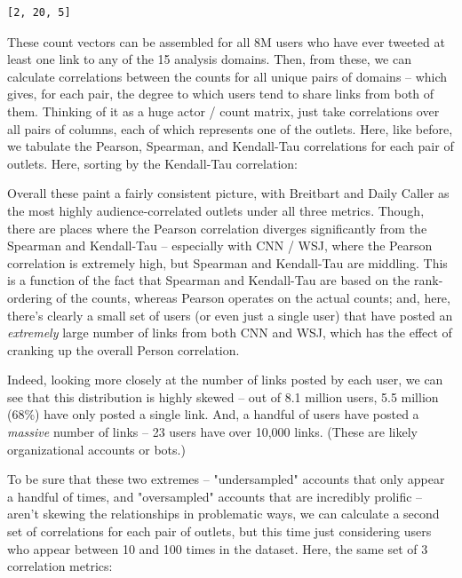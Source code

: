 \documentclass{scrartcl}
\begin{document}
\begin{lstlisting}
[2, 20, 5]
\end{lstlisting}

These count vectors can be assembled for all 8M users who have ever tweeted at least one link to any of the 15 analysis domains. Then, from these, we can calculate correlations between the counts for all unique pairs of domains -- which gives, for each pair, the degree to which users tend to share links from both of them. Thinking of it as a huge actor / count matrix, just take correlations over all pairs of columns, each of which represents one of the outlets. Here, like before, we tabulate the Pearson, Spearman, and Kendall-Tau correlations for each pair of outlets. Here, sorting by the Kendall-Tau correlation:


Overall these paint a fairly consistent picture, with Breitbart and Daily Caller as the most highly audience-correlated outlets under all three metrics. Though, there are places where the Pearson correlation diverges significantly from the Spearman and Kendall-Tau -- especially with CNN / WSJ, where the Pearson correlation is extremely high, but Spearman and Kendall-Tau are middling. This is a function of the fact that Spearman and Kendall-Tau are based on the rank-ordering of the counts, whereas Pearson operates on the actual counts; and, here, there's clearly a small set of users (or even just a single user) that have posted an \textit{extremely} large number of links from both CNN and WSJ, which has the effect of cranking up the overall Person correlation.

Indeed, looking more closely at the number of links posted by each user, we can see that this distribution is highly skewed -- out of 8.1 million users, 5.5 million (68\%) have only posted a single link. And, a handful of users have posted a \textit{massive} number of links -- 23 users have over 10,000 links. (These are likely organizational accounts or bots.)


To be sure that these two extremes -- "undersampled" accounts that only appear a handful of times, and "oversampled" accounts that are incredibly prolific -- aren't skewing the relationships in problematic ways, we can calculate a second set of correlations for each pair of outlets, but this time just considering users who appear between 10 and 100 times in the dataset. Here, the same set of 3 correlation metrics:
\end{document}
